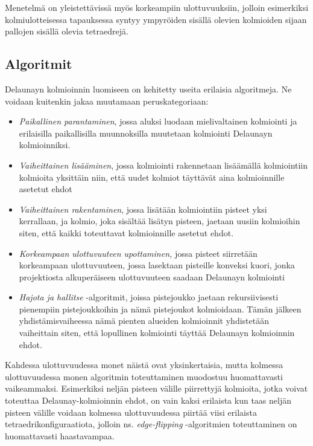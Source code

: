 \documentclass[12pt,a4paper,titlepage]{article}
\begin{document}
Menetelmä on yleistettävissä myös korkeampiin ulottuvuuksiin, jolloin esimerkiksi kolmiulotteisessa tapauksessa syntyy ympyröiden sisällä olevien kolmioiden sijaan pallojen sisällä olevia tetraedrejä. \cite{maur2002delaunay}

\subsection{Algoritmit}
Delaunayn kolmioinnin luomiseen on kehitetty useita erilaisia algoritmeja. Ne voidaan kuitenkin jakaa muutamaan peruskategoriaan:\cite{dewall}
\begin{itemize}
	\item \textit{Paikallinen parantaminen}, jossa aluksi luodaan mielivaltainen kolmiointi ja erilaisilla paikallisilla muunnoksilla muutetaan kolmiointi Delaunayn kolmioinniksi.
	\item \textit{Vaiheittainen lisääminen}, jossa kolmiointi rakennetaan lisäämällä kolmiointiin kolmioita yksittäin niin, että uudet kolmiot täyttävät aina kolmioinnille asetetut ehdot
	\item \textit{Vaiheittainen rakentaminen}, jossa lisätään kolmiointiin pisteet yksi kerrallaan, ja kolmio, joka sisältää lisätyn pisteen, jaetaan uusiin kolmioihin siten, että kaikki toteuttavat kolmioinnille asetetut ehdot. 
	\item \textit{Korkeampaan ulottuvuuteen upottaminen,} jossa pisteet siirretään korkeampaan ulottuvuuteen, jossa lasektaan pisteille konveksi kuori, jonka projektiosta alkuperäiseen ulottuvuuteen saadaan Delaunayn kolmiointi 
	\item \textit{Hajota ja hallitse} -algoritmit, joissa pistejoukko jaetaan rekursiivisesti pienempiin pistejoukkoihin ja nämä pistejoukot kolmioidaan. Tämän jälkeen yhdistämisvaiheessa nämä pienten alueiden kolmioinnit yhdistetään vaiheittain siten, että lopullinen kolmiointi täyttää Delaunayn kolmioinnin ehdot.
\end{itemize}

Kahdessa ulottuvuudessa monet näistä ovat yksinkertaisia, mutta kolmessa ulottuvuudessa monen algoritmin toteuttaminen muodostuu huomattavasti vaikeammaksi. Esimerkiksi neljän pisteen välille piirrettyjä kolmioita, jotka voivat toteuttaa Delaunay-kolmioinnin ehdot, on vain kaksi erilaista kun taas neljän pisteen välille voidaan kolmessa ulottuvuudessa piirtää viisi erilaista tetraedrikonfiguraatiota, jolloin ns. \textit{edge-flipping} -algoritmien toteuttaminen on huomattavasti haastavampaa. \cite{maur2002delaunay}
\end{document}
